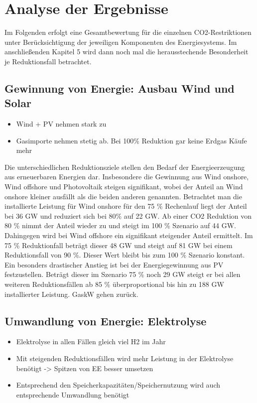 \section{Analyse der Ergebnisse}
Im Folgenden erfolgt eine Gesamtbewertung für die einzelnen CO2-Restriktionen unter Berücksichtigung der jeweiligen Komponenten des Energiesystems. Im anschließenden Kapitel 5 wird dann noch mal die herausstechende Besonderheit je Reduktionsfall betrachtet. 

\subsection{Gewinnung von Energie: Ausbau Wind und Solar}
\begin{itemize}
  \item Wind + PV nehmen stark zu
  \item Gasimporte nehmen stetig ab. Bei 100\% Reduktion gar keine Erdgas Käufe mehr
\end{itemize}
Die unterschiedlichen Reduktionsziele stellen den Bedarf der Energieerzeugung aus erneuerbaren Energien dar. Insbesondere die Gewinnung aus Wind onshore, Wind offshore und Photovoltaik steigen signifikant, wobei der Anteil an Wind onshore kleiner ausfällt als die beiden anderen genannten. Betrachtet man die installierte Leistung für Wind onshore für den 75 \% Rechenlauf liegt der Anteil bei 36 GW und reduziert sich bei 80\% auf 22 GW. Ab einer CO2 Reduktion von 80 \% nimmt der Anteil wieder zu und steigt im 100 \% Szenario auf 44 GW. Dahingegen wird bei Wind offshore ein signifikant steigender Anteil ermittelt. Im 75 \% Reduktionfall beträgt dieser 48 GW und steigt auf 81 GW bei einem Reduktionsfall von 90 \%. Dieser Wert bleibt bis zum 100 \% Szenario konstant. Ein besonders drastischer Anstieg ist bei der Energiegewinnung aus PV festzustellen. Beträgt dieser im Szenario 75 \% noch 29 GW steigt er bei allen weiteren Reduktionsfällen ab 85 \% überproportional bis hin zu 188 GW installierter Leistung. 
GaskW gehen zurück. 



\subsection{Umwandlung von Energie: Elektrolyse}
\begin{itemize}
  \item Elektrolyse in allen Fällen gleich viel H2 im Jahr
  \item Mit steigenden Reduktionsfällen wird mehr Leistung in der Elektrolyse benötigt -> Spitzen von EE besser umsetzen
  \item Entsprechend den Speicherkapazitäten/Speichernutzung wird auch entsprechende Umwandlung benötigt
\end{itemize}


